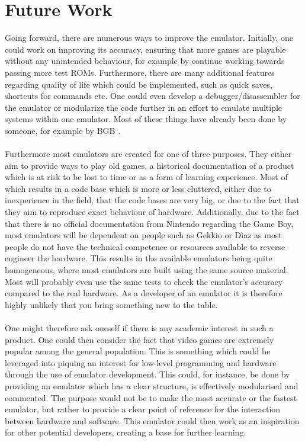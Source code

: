 \section{Future Work}
Going forward, there are numerous ways to improve the emulator. Initially, one could work on improving its accuracy, ensuring that more games are playable without any unintended behaviour, for example by continue working towards passing more test ROMs. Furthermore, there are many additional features regarding quality of life which could be implemented, such as quick saves, shortcuts for commands etc. One could even develop a debugger/disassembler for the emulator or modularize the code further in an effort to emulate multiple systems within one emulator. Most of these things have already been done by someone, for example by BGB \cite{BGB}.
\\\\
Furthermore most emulators are created for one of three purposes. They either aim to provide ways to play old games, a historical documentation of a product which is at risk to be lost to time or as a form of learning experience. Most of which results in a code base which is more or less cluttered, either due to inexperience in the field, that the code bases are very big, or due to the fact that they aim to reproduce exact behaviour of hardware. Additionally, due to the fact that there is no official documentation from Nintendo regarding the Game Boy, most emulators will be dependent on people such as Gekkio \cite{Gekkio.fi} or Dìaz \cite{TCAGBD} as most people do not have the technical competence or resources available to reverse engineer the hardware. This results in the available emulators being quite homogeneous, where most emulators are built using the same source material. Most will probably even use the same tests to check the emulator's accuracy compared to the real hardware. As a developer of an emulator it is therefore highly unlikely that you bring something new to the table.
\\\\
One might therefore ask oneself if there is any academic interest in such a product. One could then consider the fact that video games are extremely popular among the general population. This is something which could be leveraged into piquing an interest for low-level programming and hardware through the use of emulator development. This could, for instance, be done by providing an emulator which has a clear structure, is effectively modularised and commented. The purpose would not be to make the most accurate or the fastest emulator, but rather to provide a clear point of reference for the interaction between hardware and software. This emulator could then work as an inspiration for other potential developers, creating a base for further learning. 